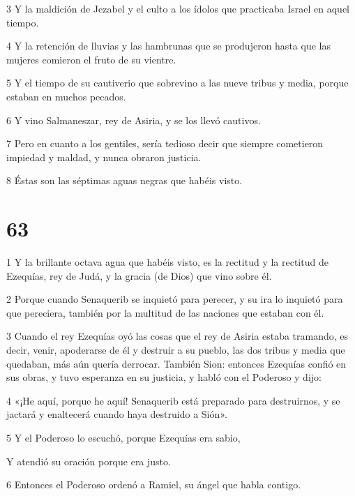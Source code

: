 \par 3 Y la maldición de Jezabel y el culto a los ídolos que practicaba Israel en aquel tiempo.

\par 4 Y la retención de lluvias y las hambrunas que se produjeron hasta que las mujeres comieron el fruto de su vientre.

\par 5 Y el tiempo de su cautiverio que sobrevino a las nueve tribus y media, porque estaban en muchos pecados.

\par 6 Y vino Salmaneszar, rey de Asiria, y se los llevó cautivos.

\par 7 Pero en cuanto a los gentiles, sería tedioso decir que siempre cometieron impiedad y maldad, y nunca obraron justicia.

\par 8 Éstas son las séptimas aguas negras que habéis visto.

\chapter{63}

\par 1 Y la brillante octava agua que habéis visto, es la rectitud y la rectitud de Ezequías, rey de Judá, y la gracia (de Dios) que vino sobre él.

\par 2 Porque cuando Senaquerib se inquietó para perecer, y su ira lo inquietó para que pereciera, también por la multitud de las naciones que estaban con él.

\par 3 Cuando el rey Ezequías oyó las cosas que el rey de Asiria estaba tramando, es decir, venir, apoderarse de él y destruir a su pueblo, las dos tribus y media que quedaban, más aún quería derrocar. También Sion: entonces Ezequías confió en sus obras, y tuvo esperanza en su justicia, y habló con el Poderoso y dijo:

\par 4 «¡He aquí, porque he aquí! Senaquerib está preparado para destruirnos, y se jactará y enaltecerá cuando haya destruido a Sión».

\par 5 Y el Poderoso lo escuchó, porque Ezequías era sabio,

Y atendió su oración porque era justo.

\par 6 Entonces el Poderoso ordenó a Ramiel, su ángel que habla contigo.

